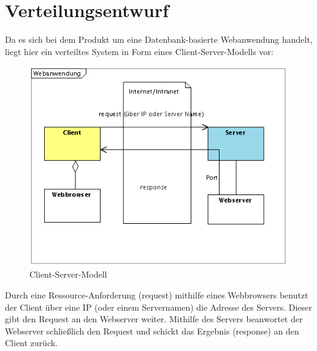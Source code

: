 \chapter{Verteilungsentwurf}
Da es sich bei dem Produkt um eine Datenbank-basierte Webanwendung handelt, liegt hier ein verteiltes System in Form eines Client-Server-Modells vor:

\begin{figure}[h]
\includegraphics[width=0.8\linewidth]{bilder/Webanwendung2.png}
\caption{Client-Server-Modell}
\label{Client-Server-Modell}
\end{figure}

Durch eine Ressource-Anforderung (request) mithilfe eines Webbrowsers benutzt der Client über eine IP (oder einem Servernamen) die Adresse des Servers. Dieser gibt den Request an den Webserver weiter.
Mithilfe des Servers beanwortet der Webserver schließlich den Request und schickt das Ergebnis (response) an den Client zurück.   

